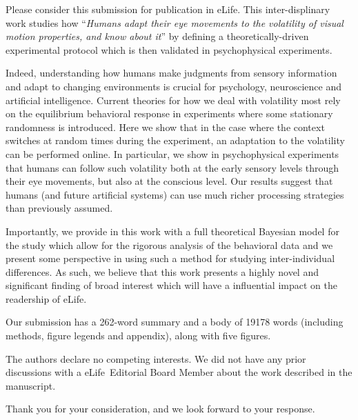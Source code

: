 \documentclass[stdletter,8pt,dateno]{newlfm}%
\newcommand{\Title}{Humans adapt their eye movements to the volatility of visual motion properties, and know about it}
\newcommand{\Journal}{eLife}%
\begin{document}
\begin{newlfm}

Please consider this submission for publication in \Journal . This inter-displinary work studies how ``\emph{\Title}'' by defining a theoretically-driven experimental protocol which is then validated in psychophysical experiments.

Indeed, understanding how humans make judgments from sensory information 
and adapt to changing environments
is crucial for psychology, neuroscience
and artificial intelligence.  
Current theories for how we deal with volatility most rely on the equilibrium behavioral response in experiments where some stationary randomness is introduced.  
Here we show that in the case where the context switches at random times during the experiment, an adaptation to the volatility can be performed online.
In particular, we show in psychophysical experiments that humans can follow such volatility both at the early sensory levels through their eye movements, but also at the conscious level. 
Our results suggest that humans (and future artificial
systems) can use much richer processing strategies than previously
assumed.

Importantly, we provide in this work with a full theoretical Bayesian model for the study which allow for the rigorous analysis of the behavioral data and we present some perspective in using such a method for studying inter-individual differences. 
As such, we believe that this work presents a highly novel and significant finding of broad interest 
which will have a influential impact on the readership of \Journal .


Our submission has a 262-word summary and a body of 19178 words
(including methods, figure legends and appendix), along with five figures.

The authors declare no competing interests.
We did not have any prior discussions with
a \Journal\ Editorial Board Member
about the work described in the manuscript.

Thank you for your consideration, and we look forward to your response.

\end{newlfm}
\end{document}
